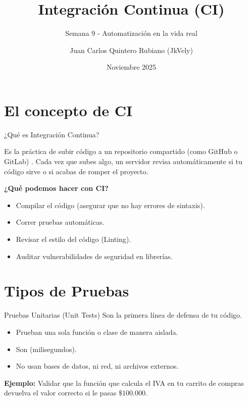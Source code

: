 \documentclass[aspectratio=169]{beamer}
\title{Integración Continua (CI)}
\subtitle{Semana 9 - Automatización en la vida real}
\author{Juan Carlos Quintero Rubiano (JkVely)}
\date{Noviembre 2025}
\begin{document}

\contentsframe

\section{El concepto de CI}

\begin{frame}{¿Qué es Integración Continua?}
    \begin{orangebox}
        Es la práctica de subir código a un repositorio compartido (como GitHub o GitLab) . Cada vez que subes algo, un servidor revisa automáticamente si tu código sirve o si acabas de romper el proyecto.
    \end{orangebox}

    \vspace{0.3cm}
    \textbf{¿Qué podemos hacer con CI?}
    \begin{itemize}
        \item Compilar el código (asegurar que no hay errores de sintaxis).
        \item Correr pruebas automáticas.
        \item Revisar el estilo del código (Linting).
        \item Auditar vulnerabilidades de seguridad en librerías.
    \end{itemize}
\end{frame}

\section{Tipos de Pruebas}

\begin{frame}{Pruebas Unitarias (Unit Tests)}
    Son la primera línea de defensa de tu código.
    
    \vspace{0.3cm}
    \begin{darkbox}[Características]
        \begin{itemize}
            \item Prueban una sola función o clase de manera aislada.
            \item Son  (milisegundos).
            \item No usan bases de datos, ni red, ni archivos externos.
        \end{itemize}
    \end{darkbox}
    
    \vspace{0.3cm}
    \textbf{Ejemplo:} Validar que la función que calcula el IVA en tu carrito de compras devuelva el valor correcto si le pasas $\$100.000$.
\end{frame}
\end{document}
